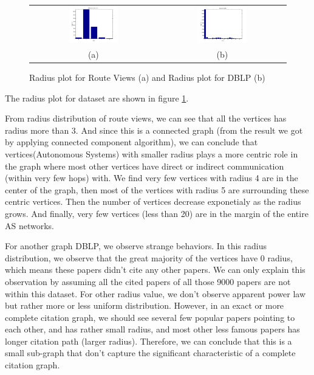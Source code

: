 \begin{figure}[htbf]
\begin{center}
\begin{tabular}{cc}
     \includegraphics[width=0.4\textwidth]{FIG/route_radius.png} &
     \includegraphics[width=0.4\textwidth]{FIG/dblp_radius.png} \\
    (a) & (b) 
\end{tabular}
\caption{Radius plot for Route Views (a) and Radius plot for DBLP (b)}
\label{fig:radius_plot}
\end{center}
\end{figure}

The radius plot for dataset are shown in figure \ref{fig:radius_plot}. 

From radius distribution of route views, we can see that all the vertices has radius more than 3. And since this is a connected graph (from the result we got by applying connected component algorithm), we can conclude that vertices(Autonomous Systems) with smaller radius plays a more centric role in the graph where most other vertices have direct or indirect communication (within very few hops) with. We find very few vertices with radius 4 are in the center of the graph, then most of the vertices with radius 5 are surrounding these centric vertices. Then the number of vertices decrease exponetialy as the radius grows. And finally, very few vertices (less than 20) are in the margin of the entire AS networks.  

For another graph DBLP, we observe strange behaviors. In this radius distribution, we observe that the great majority of the vertices have 0 radius, which means these papers didn't cite any other papers. We can only explain this observation by assuming all the cited papers of all those 9000 papers are not within this dataset. For other radius value, we don't observe apparent power law but rather more or less uniform distribution. However, in an exact or more complete citation graph, we should see several few popular papers pointing to each other, and has rather small radius, and most other less famous papers has longer citation path (larger radius). Therefore, we can conclude that this is a small sub-graph that don't capture the significant characteristic of a complete citation graph.


